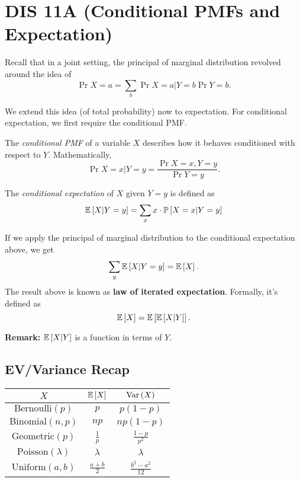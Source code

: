 \section{DIS 11A (Conditional PMFs and Expectation)}

Recall that in a joint setting, the principal of marginal distribution revolved around the idea of \[ \Pr{X = a} = \sum_{b} \Pr{X = a|Y = b} \Pr{Y = b}. \]

We extend this idea (of total probability) now to expectation. For conditional expectation, we first require the conditional PMF. 

\begin{definition}
    The \textit{conditional PMF} of a variable $X$ describes how it behaves conditioned with respect to $Y$. Mathematically, \[ \Pr{X=x|Y=y} = \frac{\Pr{X=x,Y=y}}{\Pr{Y=y}}. \]
\end{definition}

\begin{definition}
    The \textit{conditional expectation} of $X$ given $Y = y$ is defined as \[ \mathbb{E}\left[ X|Y=y \right] = \sum_{x} x \cdot \mathbb{P}\left[ X = x | Y = y \right]\]
\end{definition}

If we apply the principal of marginal distribution to the conditional expectation above, we get \[ \sum_{y} \mathbb{E}\left[ X|Y=y \right] = \mathbb{E}\left[ X \right]. \]
The result above is known as \textbf{law of iterated expectation}. Formally, it's defined as \[ \mathbb{E}\left[ X \right] = \mathbb{E}\left[ \mathbb{E}\left[ X|Y \right] \right]. \]

\textbf{Remark:} $\mathbb{E}\left[ X|Y \right]$ is a function in terms of $Y$. 

\subsection{EV/Variance Recap}

\begin{center}
    \begin{tabular}{|c|c|c|}
        \hline 
        $X$ & $\mathbb{E}\left[ X \right]$ & $\text{Var}\left( X \right)$ \\
        \hline
        $\text{Bernoulli}(p)$ & $p$ & $p(1-p)$ \\
        \hline
        $\text{Binomial}(n,p)$ & $np$ & $np(1-p)$ \\
        \hline
        $\text{Geometric}(p)$ & $\frac{1}{p}$ & $\frac{1-p}{p^2}$ \\
        \hline
        $\text{Poisson}(\lambda)$ & $\lambda$ & $\lambda$ \\
        \hline
        $\text{Uniform}(a,b)$ & $\frac{a+b}{2}$ & $\frac{b^2-a^2}{12}$ \\
        \hline
    \end{tabular}
\end{center}